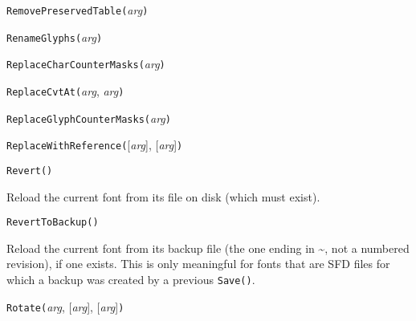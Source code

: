 

\texttt{RemovePreservedTable(}\textit{arg}\texttt{)}



\texttt{RenameGlyphs(}\textit{arg}\texttt{)}



\texttt{ReplaceCharCounterMasks(}\textit{arg}\texttt{)}



\texttt{ReplaceCvtAt(}\textit{arg}, \textit{arg}\texttt{)}



\texttt{ReplaceGlyphCounterMasks(}\textit{arg}\texttt{)}



\texttt{ReplaceWithReference(}[\textit{arg}], [\textit{arg}]\texttt{)}



\texttt{Revert()}

Reload the current font from its file on disk (which must exist).



\texttt{RevertToBackup()}

Reload the current font from its backup file (the one ending in
\textasciitilde, not a numbered revision), if one exists.  This is only
meaningful for fonts that are SFD files for which a backup was created by a
previous \texttt{Save()}.



\texttt{Rotate(}\textit{arg}, [\textit{arg}], [\textit{arg}]\texttt{)}


